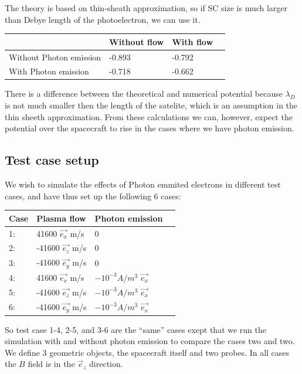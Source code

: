 The theory is based on thin-sheath approximation, so if SC size is much larger than Debye length of the photoelectron, we can use it.\\

\begin{center}
    \begin{tabular}{ | l | l | l | p{5cm} |}
    \hline
     & Without flow & With flow  \\ \hline
     Without Photon emission & -0.893   & -0.792 \\ \hline
     With Photon emission & -0.718 & -0.662 \\
    \hline
    \end{tabular}
\end{center}

There is a difference between the theoretical and numerical potential because $\lambda_D$ is not much
smaller then the length of the satelite, which is an assumption in the thin sheeth approximation.
From these calculations we can, however, expect the potential over the spacecraft to rise
in the cases where we have photon emission.

\subsection{Test case setup}

We wish to simulate the effects of Photon emmited electrons in different test cases, and have thus set up the following
6 cases:
\begin{center}
    \begin{tabular}{ | l | l | l | p{5cm} |}
    \hline
    Case & Plasma flow & Photon emission  \\ \hline
     1: & 41600 $\vec{e_x}$ m/s  & 0 \\ \hline
     2: & -41600 $\vec{e_z}$ m/s & 0 \\ \hline
     3: & -41600 $\vec{e_y}$ m/s & 0 \\ \hline
     4: & 41600 $\vec{e_x}$ m/s & $-10^{-3} A/m^{3}$ $\vec{e_x}$\\ \hline
     5: & -41600 $\vec{e_z}$ m/s & $-10^{-3} A/m^{3}$ $\vec{e_x}$\\ \hline
     6: & -41600 $\vec{e_y}$ m/s & $-10^{-3} A/m^{3}$  $\vec{e_x}$\\
    \hline
    \end{tabular}
\end{center}

So test case 1-4, 2-5, and 3-6 are the ``same'' cases exept that we run the simulation with and without
photon emission to compare the cases two and two. We define 3 geometric objects, the spacecraft itself
and two probes. In all cases the $B$ field is in the $\vec e_z$ direction.

